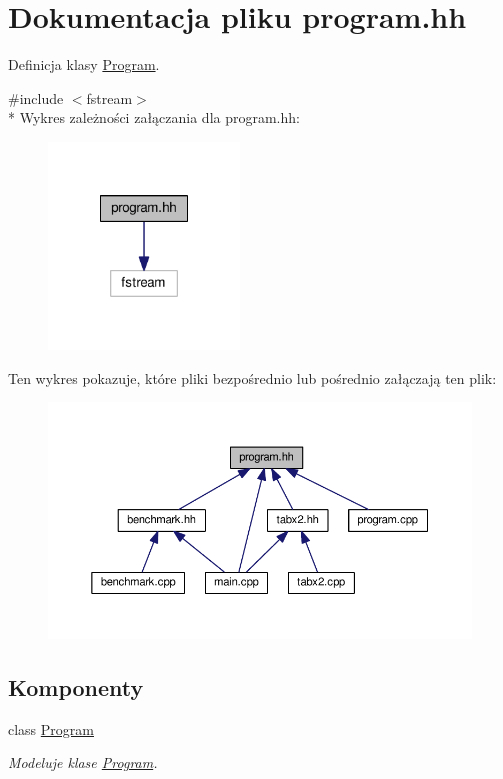 \hypertarget{program_8hh}{\section{Dokumentacja pliku program.\-hh}
\label{program_8hh}
}


Definicja klasy \hyperlink{class_program}{Program}.  


{\ttfamily \#include $<$fstream$>$}\\*
Wykres zależności załączania dla program.\-hh\-:
\nopagebreak
\begin{figure}[H]
\begin{center}
\leavevmode
\includegraphics[width=144pt]{program_8hh__incl}
\end{center}
\end{figure}
Ten wykres pokazuje, które pliki bezpośrednio lub pośrednio załączają ten plik\-:
\nopagebreak
\begin{figure}[H]
\begin{center}
\leavevmode
\includegraphics[width=350pt]{program_8hh__dep__incl}
\end{center}
\end{figure}
\subsection*{Komponenty}
\begin{DoxyCompactItemize}
\item 
class \hyperlink{class_program}{Program}
\begin{DoxyCompactList}\small\item\em Modeluje klase \hyperlink{class_program}{Program}. \end{DoxyCompactList}\end{DoxyCompactItemize}

